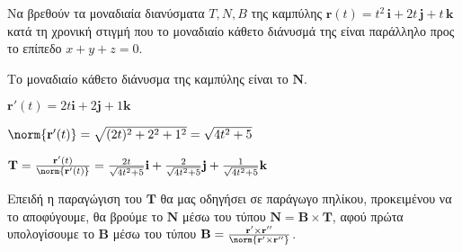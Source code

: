 \documentclass[a4paper,table]{report}
\begin{document}
\begin{mybox3}
  \begin{thema}
    Να βρεθούν τα μοναδιαία διανύσματα $ T,N,B $ της καμπύλης $ \mathbf{r}(t)=t^{2}\,
    \mathbf{i} + 2t\, \mathbf{j} + t \, \mathbf{k} $ κατά τη χρονική στιγμή που 
    το μοναδιαίο κάθετο διάνυσμά της είναι παράλληλο προς το επίπεδο $ x+y+z=0 $.
  \end{thema}
\end{mybox3}
\begin{solution}
  \item {}
    Το μοναδιαίο κάθετο διάνυσμα της καμπύλης είναι το $ \mathbf{N} $. 
    \begin{myitemize}
      \item $ \mathbf{r}'(t) = 2t \mathbf{i} + 2 \mathbf{j} + 1 \mathbf{k} $ 
      \item $ \norm{\mathbf{r}'(t)} = \sqrt{(2t)^{2}+2^{2}+1^{2}} = \sqrt{4t^{2}+5} $
      \item $ \mathbf{T} = \frac{\mathbf{r}'(t)}{\norm{\mathbf{r}'(t)}} =  
        \frac{2t}{\sqrt{4t^{2}+5}} \mathbf{i} + \frac{2}{\sqrt{4t^{2}+5}}
        \mathbf{j} + \frac{1}{\sqrt{4t^{2}+5}} \mathbf{k}$
    \end{myitemize}
    Επειδή η παραγώγιση του $ \mathbf{T} $ θα μας οδηγήσει σε παράγωγο πηλίκου,
    προκειμένου να το αποφύγουμε, θα βρούμε το $ \mathbf{N} $ μέσω του τύπου $ \mathbf{N}
    = \mathbf{B} \times \mathbf{T} $, αφού πρώτα υπολογίσουμε το $ \mathbf{B} $ μέσω του 
    τύπου $ \mathbf{B} = \frac{\mathbf{r}' \times \mathbf{r}''}{\norm{\mathbf{r}'
    \times \mathbf{r}''}} $.
\end{solution}
\end{document}

